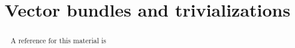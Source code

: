 \documentclass{ximera}
\title{Vector bundles and trivializations}
\begin{document}
    \begin{abstract} A reference for this material is   \end{abstract}
    \maketitle
\end{document}
